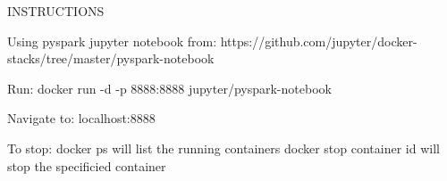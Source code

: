 INSTRUCTIONS

Using pyspark jupyter notebook from:
https://github.com/jupyter/docker-stacks/tree/master/pyspark-notebook

Run:
docker run -d -p 8888:8888 jupyter/pyspark-notebook

Navigate to:
localhost:8888

To stop:
docker ps will list the running containers
docker stop container id will stop the specificied container